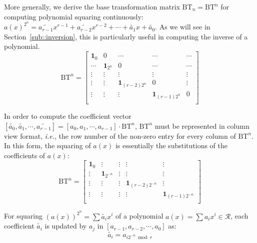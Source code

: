 \documentclass[runningheads]{llncs}
\begin{document}
%
More generally, we derive the base transformation matrix $\text{BT}_n=\text{BT}^n$ for 
computing polynomial squaring continuously: 
$a(x)^{2^n}=\widetilde{a_{r-1}}x^{r-1}+\widetilde{a_{r-2}}x^{r-2}+\cdots + \widetilde{a_{1}}x +\widetilde{a_0}$.
As we will see in Section~\ref{sub::inversion}, 
this is particularly useful in computing the 
inverse of a polynomial.
\[
\text{BT}^n =
\left[ \begin{array}{ccccc}
\mathbf{1}_{0}&0&\cdots&\cdots&\cdots  \\
\cdots&\mathbf{1}_{2^n}&0 &\cdots&\cdots \\
\vdots&\vdots&\vdots&\vdots&\vdots\\
\vdots&\vdots&\mathbf{1}_{(r-2)2^n}&0&\vdots\\
\vdots&\vdots&\vdots&\mathbf{1}_{(r-1)2^n}&0\\
\end{array}
\right ]
\]

In order to compute the coefficient vector $[\widetilde{a_{0}},\widetilde{a_{1}},\cdots,\widetilde{a_{r-1}}]=[{a_{0}},{a_{1}},\cdots,{a_{r-1}}]
\cdot \text{BT}^n$, $\text{BT}^n$ must be represented in column view format, \textit{i.e.},
the row number of the non-zero entry for every column of $\text{BT}^n$. In this form, the squaring of $a(x)$ is essentially the substitutions of the coefficients of $a(x)$:
\[
\text{BT}^n =
\left[ \begin{array}{ccccc}
\mathbf{1}_{0}&\vdots& \vdots&\vdots&\vdots \\
\vdots&\mathbf{1}_{2^{-n}}&\vdots&\vdots&\vdots\\
\vdots&\vdots&\vdots&\mathbf{1}_{(r-2)2^{-n}}&\vdots\\
\vdots&\vdots&\vdots&\vdots&\mathbf{1}_{(r-1)2^{-n}}\\
\end{array}
\right ]
\]

\begin{theorem}
For squaring $(a(x))^{2^n}=\sum\widetilde{a_{i}}x^i$ of a polynomial $a(x)=\sum a_ix^i \in \mathcal{R}$, each coefficient $\widetilde{a_{i}}$ is updated by $a_{j}$ in $[{a_{r-1}},{a_{r-2}},\cdots,{a_0}]$ as:
\[
    \widetilde{a_{i}} = a_{i2^{-n}\bmod r}
\]
\end{theorem}
\end{document}
